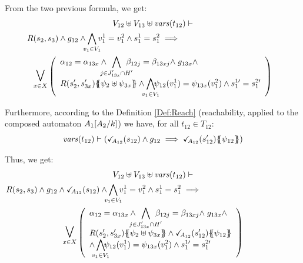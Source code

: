 \documentclass[runningheads]{llncs}
\begin{document}
\begin{enumerate}
From the two previous formula, we get: 
\begin{multline*}
V_{12} \uplus V_{13}  \uplus \fvars{t_{12}} \vdash\\
R\mpar{s_2, s_{3}} \wedge g_{12}  \land \bigwedge_\subbox{v_1\in V_1} v^1_1=v^2_1  \wedge s^1_1 = s^2_1 
\implies \hspace{12em}\\ \operatorname*{\bigsymb{\bigvee}}_{x \in X} \mpar{\everymath{\displaystyle}
\begin{array}{l}
			\alpha_{12} = \alpha_{13x} \wedge \bigwedge_\subbox{j \in J'_{13x} \cap H'} \beta_{12j} = \beta_{13xj} \nwedge g_{13x} \wedge \\
			 R\mpar{s'_2, s'_{3x}}\psubst{\psi_2 \uplus \psi_{3x}} \wedge \bigwedge_\subbox{v_1\in V_1}\!\! \psi_{12}(v^1_1)=\psi_{13x}(v^2_1)  \wedge s^{1\prime}_1 = s^{2\prime}_1
		\end{array}}   
\end{multline*}	


 Furthermore, according to the Definition \ref{Def:Reach} (reachability, applied to the composed automaton \(A_1{\left[A_2\middle/k\right]}\)) we have, for all $t_{12} \in T_{12}$:
\[ \fvars{t_{12}} \vdash \left(\reach{A_{12}}\mpar{s_{12}} \wedge g_{12} \implies \reach{A_{12}}\mpar{s_{12}'}\psubst{\psi_{12}}\right) \]	

Thus, we get:
\begin{multline*}
V_{12} \uplus V_{13}  \uplus \fvars{t_{12}} \vdash\\
R\mpar{s_2, s_{3}} \wedge g_{12} \land \reach{A_{12}}\mpar{s_{12}} \land \bigwedge_\subbox{v_1\in V_1} v^1_1=v^2_1  \wedge s^1_1 = s^2_1 
\implies \hspace{12em}\\ \operatorname*{\bigsymb{\bigvee}}_{x \in X} \mpar{\everymath{\displaystyle}
\begin{array}{l}
			\alpha_{12} = \alpha_{13x} \wedge \bigwedge_\subbox{j \in J'_{13x} \cap H'} \beta_{12j} = \beta_{13xj} \nwedge g_{13x} \wedge \\
			 R\mpar{s'_2, s'_{3x}}\psubst{\psi_2 \uplus \psi_{3x}} \land \reach{A_{12}}\mpar{s_{12}'}\psubst{\psi_{12}} \\
\wedge \bigwedge_\subbox{v_1\in V_1}\!\! \psi_{12}(v^1_1)=\psi_{13x}(v^2_1)  \wedge s^{1\prime}_1 = s^{2\prime}_1
		\end{array}}   
\end{multline*}	




\end{enumerate}
\end{document}
